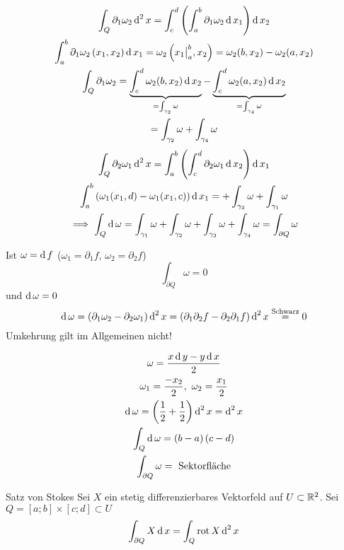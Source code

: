 \begin{Bew}
  \begin{gather*}
    \int_Q\partial_1\omega_2\operatorname{d}^2x=\int_c^d\left( \int_a^b \partial_1\omega_2\operatorname{d} x_1 \right)\operatorname{d} x_2\\
    \int_a^b\partial_1\omega_2\left( x_1,x_2 \right)\operatorname{d} x_1=\omega_2\left( x_1\big|^b_a,x_2 \right) = \omega_2(b,x_2)-\omega_2(a,x_2)\\
    \int_Q\partial_1\omega_2=\underbrace{\int_c^d\omega_2(b,x_2)\operatorname{d} x_2}_{=\int_{\gamma_2}\omega}-\underbrace{\int^d_c\omega_2(a,x_2)\operatorname{d} x_2}_{=\int_{\gamma_4}\omega}\\
    =\int_{\gamma_2}\omega+\int_{\gamma_4}\omega
  \end{gather*}
  \begin{gather*}
    \int_Q\partial_2\omega_1\operatorname{d}^2x=\int_a^b\left( \int_c^d \partial_2\omega_1\operatorname{d} x_2 \right)\operatorname{d} x_1\\
    \int_a^b\left( \omega_1(x_1,d)-\omega_1(x_1,c) \right)\operatorname{d} x_1=+\int_{\gamma_3}\omega+\int_{\gamma_1}\omega\\
    \implies\int_Q\operatorname{d}\omega=\int_{\gamma_1}\omega+\int_{\gamma_2}\omega+\int_{\gamma_3}\omega+\int_{\gamma_4}\omega=\int_{\partial Q}\omega
  \end{gather*}
\end{Bew}
\begin{Bem}
  Ist $\omega=\operatorname{d} f$ ($\omega_1=\partial_1f$, $\omega_2=\partial_2f$)
  \[\int_{\partial Q}\omega=0\]
  und $\operatorname{d}\omega = 0$
  \[\operatorname{d}\omega = \left( \partial_1\omega_2-\partial_2\omega_1 \right)\operatorname{d}^2x=\left( \partial_1\partial_2f-\partial_2\partial_1f \right)\operatorname{d}^2 x \stackrel{\text{Schwarz}}{=}0\]
  Umkehrung gilt im Allgemeinen nicht!
\end{Bem}
\begin{Bsp}
  \begin{gather*}
    \omega=\frac{x\operatorname{d} y-y\operatorname{d} x}{2}\\
    \omega_1=\frac{-x_2}{2},\ \omega_2=\frac{x_1}{2}\\
    \operatorname{d}\omega = \left( \frac{1}{2}+\frac{1}{2} \right)\operatorname{d}^2 x=\operatorname{d}^2x\\
    \int_Q\operatorname{d} \omega=\left( b-a \right)\left( c-d \right)\\
    \int_{\partial Q}\omega = \ \text{Sektorfläche}
  \end{gather*}
\end{Bsp}
\begin{Sat}{Satz von Stokes} Sei $X$ ein stetig differenzierbares Vektorfeld auf $U\subset\mathbb{R}^2$. Sei $Q=\left[ a;b \right]\times\left[ c;d \right]\subset U$
  \[\int_{\partial Q}X\operatorname{d} x=\int_Q\operatorname{rot} X\operatorname{d}^2x\]
\end{Sat}
